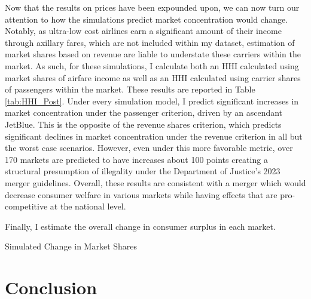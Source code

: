 \documentclass{article}
\begin{document}
    Now that the results on prices have been expounded upon, we can now turn our attention to how the simulations predict market concentration would change. Notably, as ultra-low cost airlines earn a significant amount of their income through axillary fares, which are not included within my dataset, estimation of market shares based on revenue are liable to understate these carriers within the market. As such, for these simulations, I calculate both an HHI calculated using market shares of airfare income as well as an HHI calculated using carrier shares of passengers within the market. These results are reported in Table  \ref{tab:HHI_Post}. Under every simulation model, I predict significant increases in market concentration under the passenger criterion, driven by an ascendant JetBlue. This is the opposite of the revenue shares criterion, which predicts significant declines in market concentration under the revenue criterion in all but the worst case scenarios. However, even under this more favorable metric, over 170 markets are predicted to have increases about 100 points creating a structural presumption of illegality under the Department of Justice's 2023 merger guidelines. Overall, these results are consistent with a merger which would decrease consumer welfare in various markets while having effects that are pro-competitive at the national level.  

    Finally, I estimate the overall change in consumer surplus in each market. 

      \begin{table}
        \caption{Simulated Change in Market Shares}
        \label{tab:HHI_Post}
        \vspace{-15mm}
        \begin{center}
        
        \end{center}
    \end{table}
    
	\section{Conclusion}
	\label{sec:Conclusion}
	
	\pagebreak 
	 
	
	\FloatBarrier
	
\end{document}
